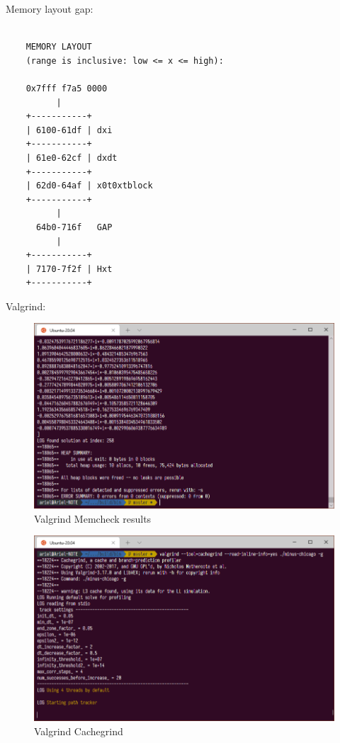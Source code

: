 Memory layout gap:
\footnotesize\begin{verbatim}

    MEMORY LAYOUT
    (range is inclusive: low <= x <= high):

    0x7fff f7a5 0000
          |
    +-----------+
    | 6100-61df | dxi
    +-----------+
    | 61e0-62cf | dxdt
    +-----------+
    | 62d0-64af | x0t0xtblock
    +-----------+
          |
      64b0-716f   GAP
          |
    +-----------+
    | 7170-7f2f | Hxt
    +-----------+
\end{verbatim}
\normalsize

Valgrind:
\begin{figure}[H]
    \includegraphics[width=\columnwidth]{figs/valgrind_memcheck}
    \caption{Valgrind Memcheck results}
\end{figure}
\begin{figure}[H]
    \includegraphics[width=\columnwidth]{figs/valgrind_cachegrind}
    \caption{Valgrind Cachegrind}
\end{figure}
